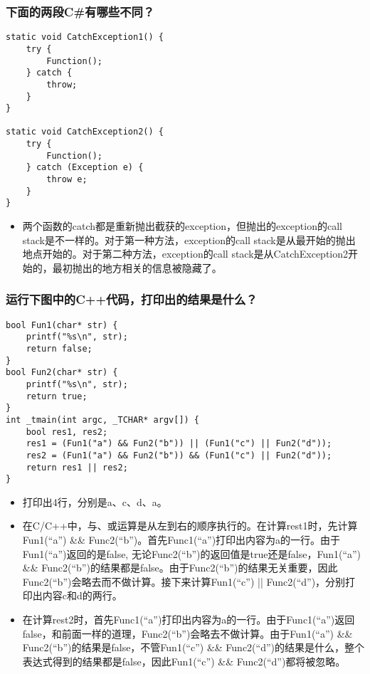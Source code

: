 \documentclass[9pt, b5paper]{article}
\begin{document}
\subsubsection{下面的两段C\#有哪些不同？}
\label{sec-1-2-90}
\begin{verbatim}
static void CatchException1() {
    try {
        Function();
    } catch {
        throw;
    }
}
 
static void CatchException2() {
    try {
        Function();
    } catch (Exception e) {
        throw e;
    }
}
\end{verbatim}
\begin{itemize}
\item 两个函数的catch都是重新抛出截获的exception，但抛出的exception的call stack是不一样的。对于第一种方法，exception的call stack是从最开始的抛出地点开始的。对于第二种方法，exception的call stack是从CatchException2开始的，最初抛出的地方相关的信息被隐藏了。
\end{itemize}
\subsubsection{运行下图中的C++代码，打印出的结果是什么？}
\label{sec-1-2-91}
\begin{verbatim}
bool Fun1(char* str) {
    printf("%s\n", str);
    return false;
}
bool Fun2(char* str) {
    printf("%s\n", str);
    return true;
}
int _tmain(int argc, _TCHAR* argv[]) {
    bool res1, res2;
    res1 = (Fun1("a") && Fun2("b")) || (Fun1("c") || Fun2("d"));
    res2 = (Fun1("a") && Fun2("b")) && (Fun1("c") || Fun2("d"));
    return res1 || res2;
}
\end{verbatim}
\begin{itemize}
\item 打印出4行，分别是a、c、d、a。
\item 在C/C++中，与、或运算是从左到右的顺序执行的。在计算rest1时，先计算Fun1(“a”) \&\& Func2(“b”)。首先Func1(“a”)打印出内容为a的一行。由于Fun1(“a”)返回的是false, 无论Func2(“b”)的返回值是true还是false，Fun1(“a”) \&\& Func2(“b”)的结果都是false。由于Func2(“b”)的结果无关重要，因此Func2(“b”)会略去而不做计算。接下来计算Fun1(“c”) || Func2(“d”)，分别打印出内容c和d的两行。
\item 在计算rest2时，首先Func1(“a”)打印出内容为a的一行。由于Func1(“a”)返回false，和前面一样的道理，Func2(“b”)会略去不做计算。由于Fun1(“a”) \&\& Func2(“b”)的结果是false，不管Fun1(“c”) \&\& Func2(“d”)的结果是什么，整个表达式得到的结果都是false，因此Fun1(“c”) \&\& Func2(“d”)都将被忽略。
\end{itemize}
\end{document}
